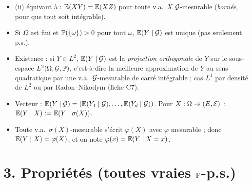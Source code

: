 \documentclass[11pt,a4paper]{article}
\begin{document}
\begin{remarque}\leavevmode
\begin{itemize}
  \item (ii) équivaut à : $\mathbb{E}(XY)=\mathbb{E}(XZ)$ pour toute v.a.\ $X$ $\mathcal{G}$-mesurable (\emph{bornée}, pour que tout soit intégrable).
  \item Si $\Omega$ est fini et $\mathbb{P}(\{\omega\})>0$ pour tout $\omega$, $\mathbb{E}(Y\mid\mathcal{G})$ est unique (pas seulement p.s.).
  \item Existence : si $Y\in L^2$, $\mathbb{E}(Y\mid\mathcal{G})$ est la \emph{projection orthogonale} de $Y$ sur le sous-espace $L^2(\Omega,\mathcal{G},\mathbb{P})$,
  c'est-à-dire la meilleure approximation de $Y$ au sens quadratique par une v.a.\ $\mathcal{G}$-mesurable de carré intégrable ; cas $L^1$ par densité de $L^2$
  ou par Radon--Nikodym (fiche C7).
  \item Vecteur : $\mathbb{E}(Y\mid\mathcal{G})=(\mathbb{E}(Y_1\mid\mathcal{G}),\dots,\mathbb{E}(Y_d\mid\mathcal{G}))$. Pour $X:\Omega\to(E,\mathcal{E})$ : $\mathbb{E}(Y\mid X):=\mathbb{E}(Y\mid\sigma(X))$.
  \item Toute v.a.\ $\sigma(X)$-mesurable s'écrit $\varphi(X)$ avec $\varphi$ mesurable ; donc $\mathbb{E}(Y\mid X)=\varphi(X)$, et on note
  $\varphi(x)=\mathbb{E}(Y\mid X=x)$.
\end{itemize}
\end{remarque}

\section*{3. Propriétés (toutes vraies $\mathbb{P}$-p.s.)}
\end{document}
